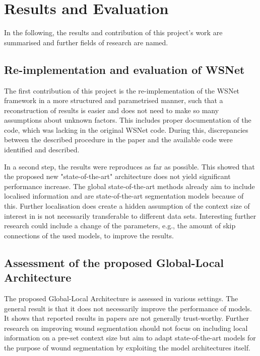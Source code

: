\section{Results and Evaluation}

In the following, the results and contribution of this project's work are summarised and further fields of research are named.

\subsection{Re-implementation and evaluation of WSNet}

The first contribution of this project is the re-implementation of the WSNet framework in a more structured and parametrised manner, such that a reconstruction of results is easier and does not need to make so many assumptions about unknown factors. This includes proper documentation of the code, which was lacking in the original WSNet code. During this, discrepancies between the described procedure in the paper and the available code were identified and described.

In a second step, the results were reproduces as far as possible. This showed that the proposed new "state-of-the-art" architecture does not yield significant performance increase. The global state-of-the-art methods already aim to include localised information and are state-of-the-art segmentation models because of this. Further localisation does create a hidden assumption of the context size of interest in is not necessarily transferable to different data sets. Interesting further research could include a change of the parameters, e.g., the amount of skip connections of the used models, to improve the results.

\subsection{Assessment of the proposed Global-Local Architecture}

The proposed Global-Local Architecture is assessed in various settings. The general result is that it does not necessarily improve the performance of models. It shows that reported results in papers are not generally trust-worthy. Further research on improving wound segmentation should not focus on including local information on a pre-set context size but aim to adapt state-of-the-art models for the purpose of wound segmentation by exploiting the model architectures itself.

